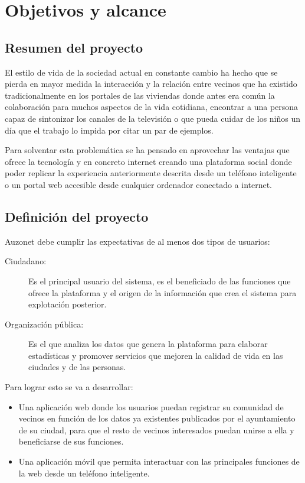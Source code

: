 \documentclass{DeustoFDP}
\begin{document}
\chapter{Objetivos y alcance}\label{cha:objetivosyalcance}
\section{Resumen del proyecto}
El estilo de vida de la sociedad actual en constante cambio ha hecho que se pierda en mayor medida la interacción y la relación entre vecinos que ha existido tradicionalmente en los portales de las viviendas donde antes era común la colaboración para muchos aspectos de la vida cotidiana, encontrar a una persona capaz de sintonizar los canales de la televisión o que pueda cuidar de los niños un día que el trabajo lo impida por citar un par de ejemplos.

Para solventar esta problemática se ha pensado en aprovechar las ventajas que ofrece la tecnología y en concreto internet creando una plataforma social donde poder replicar la experiencia anteriormente descrita desde un teléfono inteligente o un portal web accesible desde cualquier ordenador conectado a internet.

\section{Definición del proyecto}
Auzonet debe cumplir las expectativas de al menos dos tipos de usuarios:
\begin{description}
    \item[Ciudadano:] Es el principal usuario del sistema, es el beneficiado de las funciones que ofrece la plataforma y el origen de la información que crea el sistema para explotación posterior.
    \item[Organización pública:] Es el que analiza los datos que genera la plataforma para elaborar estadísticas y promover servicios que mejoren la calidad de vida en las ciudades y de las personas.
\end{description}

Para lograr esto se va a desarrollar:
\begin{itemize}
    \item Una aplicación web donde los usuarios puedan registrar su comunidad de vecinos en función de los datos ya existentes publicados por el ayuntamiento de su ciudad, para que el resto de vecinos interesados puedan unirse a ella y beneficiarse de sus funciones.
    \item Una aplicación móvil que permita interactuar con las principales funciones de la web desde un teléfono inteligente.
\end{itemize}
\end{document}

